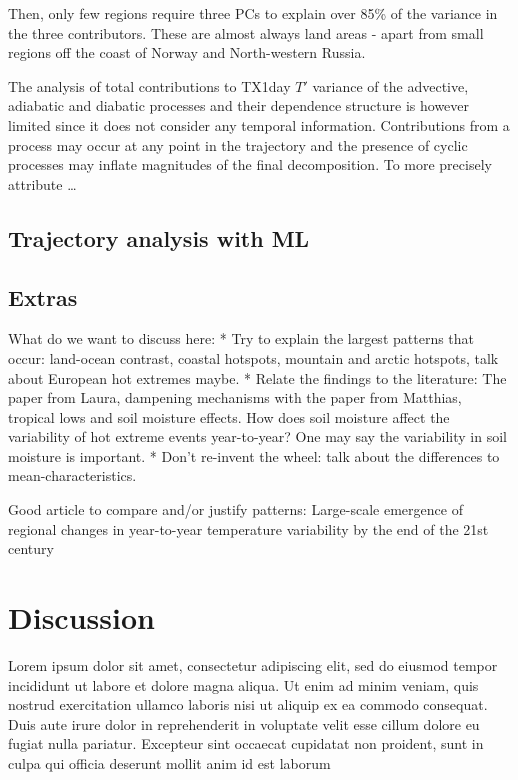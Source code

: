 \documentclass[11pt,a4paper,twoside,openright]{report}
\theoremstyle{definition}
\begin{document}
Then, only few regions require three PCs to explain over 85\% of the variance in the three contributors. These are almost always land areas - apart from small regions off the coast of Norway and North-western Russia.

The analysis of total contributions to TX1day \(T'\) variance of the advective, adiabatic and diabatic processes and their dependence structure is however limited since it does not consider any temporal information. Contributions from a process may occur at any point in the trajectory and the presence of cyclic processes may inflate magnitudes of the final decomposition. To more precisely attribute \ldots{}

\section{Trajectory analysis with ML}\label{trajectory-analysis-with-ml}

\section{Extras}\label{extras}

What do we want to discuss here:
* Try to explain the largest patterns that occur: land-ocean contrast, coastal hotspots, mountain and arctic hotspots, talk about European hot extremes maybe.
* Relate the findings to the literature: The paper from Laura, dampening mechanisms with the paper from Matthias, tropical lows and soil moisture effects. How does soil moisture affect the variability of hot extreme events year-to-year? One may say the variability in soil moisture is important.
* Don't re-invent the wheel: talk about the differences to mean-characteristics.

Good article to compare and/or justify patterns: Large-scale emergence of regional changes in year-to-year temperature variability by the end of the 21st century

\chapter{Discussion}\label{discussion}

Lorem ipsum dolor sit amet, consectetur adipiscing elit, sed do eiusmod tempor
incididunt ut labore et dolore magna aliqua. Ut enim ad minim veniam, quis
nostrud exercitation ullamco laboris nisi ut aliquip ex ea commodo consequat.
Duis aute irure dolor in reprehenderit in voluptate velit esse cillum dolore
eu fugiat nulla pariatur. Excepteur sint occaecat cupidatat non proident, sunt
in culpa qui officia deserunt mollit anim id est laborum
\end{document}
